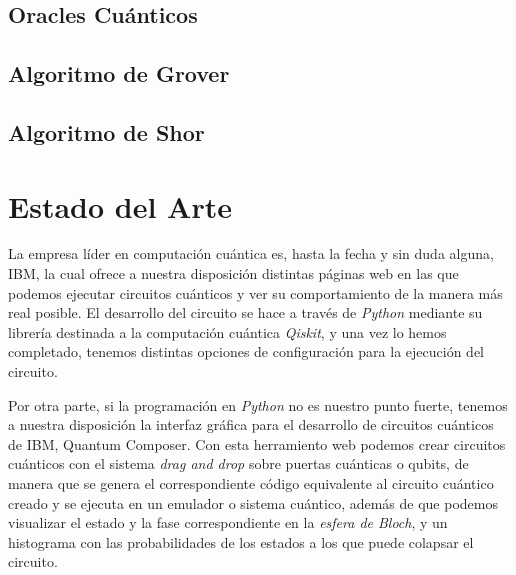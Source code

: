 \documentclass{article}
\numberwithin{equation}{section} %
\begin{document}
    \subsection{Oracles Cuánticos}
    \subsection{Algoritmo de Grover}
    \subsection{Algoritmo de Shor}





    \newpage
    \thispagestyle{empty}
    \mbox{}

    \section{Estado del Arte}

    \vspace{5mm}

    La empresa líder en computación cuántica es, hasta la fecha y sin duda alguna, IBM, la cual ofrece a nuestra disposición distintas páginas web en las que podemos ejecutar circuitos cuánticos y ver su comportamiento de la manera más real posible. El desarrollo del circuito se hace a través de \textit{Python} mediante su librería destinada a la computación cuántica \textit{Qiskit}, y una vez lo hemos completado, tenemos distintas opciones de configuración para la ejecución del circuito.

    \vspace{5mm}

    Por otra parte, si la programación en \textit{Python} no es nuestro punto fuerte, tenemos a nuestra disposición la interfaz gráfica para el desarrollo de circuitos cuánticos de IBM, Quantum Composer. Con esta herramiento web podemos crear circuitos cuánticos con el sistema \textit{drag and drop} sobre puertas cuánticas o qubits, de manera que se genera el correspondiente código equivalente al circuito cuántico creado y se ejecuta en un emulador o sistema cuántico, además de que podemos visualizar el estado y la fase correspondiente en la \textit{esfera de Bloch}, y un histograma con las probabilidades de los estados a los que puede colapsar el circuito.
    
    \vspace{5mm}
\end{document}
